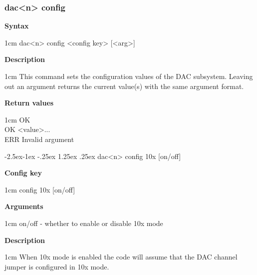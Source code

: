 \documentclass{article}[a4paper]
\makeatletter
\newcommand\subsubsubsection{\@startsection{paragraph}{4}{\z@}%
            {-2.5ex\@plus -1ex \@minus -.25ex}%
            {1.25ex \@plus .25ex}%
            {\normalfont\normalsize\bfseries}}
\makeatother
\begin{document}
\subsubsection{dac<n> config}
\begin{tcolorbox}
	{\bf Syntax}

	 1cm \dimexpr\linewidth-2cm\relax
	dac<n> config <config key> [<arg>]

	\medskip
	{\bf Description}

	 1cm \dimexpr\linewidth-2cm\relax
	This command sets the configuration values of the DAC subsystem.
	Leaving out an argument returns the current value(s) with the same argument
	format.

	\medskip
	{\bf Return values}

	 1cm \dimexpr\linewidth-2cm\relax
	OK \\
	OK <value>... \\
	ERR Invalid argument
\end{tcolorbox}

\subsubsubsection{dac<n> config 10x [on/off]}
\begin{tcolorbox}
	{\bf Config key}

	 1cm \dimexpr\linewidth-2cm\relax
	config 10x [on/off]

	\medskip
	{\bf Arguments}

	 1cm \dimexpr\linewidth-2cm\relax
	on/off - whether to enable or disable 10x mode

	\medskip
	{\bf Description}

	 1cm \dimexpr\linewidth-2cm\relax
	When 10x mode is enabled the code will assume that the DAC channel jumper is configured
	in 10x mode.
\end{tcolorbox}
\end{document}
